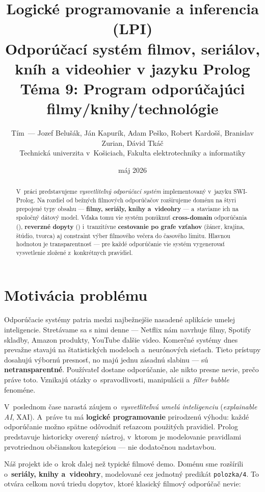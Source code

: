 \documentclass[11pt,a4paper]{article}
\title{
  \large Logické programovanie a inferencia (LPI) \\[0.4em]
  \LARGE Odporúčací systém filmov, seriálov, kníh a videohier v jazyku Prolog \\[0.4em]
  \large Téma 9: Program odporúčajúci filmy/knihy/technológie
}
\author{
  Tím~--- Jozef Belušák, Ján Kapurík, Adam Peško, Robert Kardošš, Branislav Zurian, Dávid Tkáč \\
  Technická univerzita v~Košiciach, Fakulta elektrotechniky a informatiky
}
\date{máj 2026}
\begin{document}
\maketitle

\begin{abstract}
\noindent
V~práci predstavujeme \emph{vysvetliteľný odporúčací systém}
implementovaný v~jazyku SWI-Prolog. Na rozdiel od bežných
filmových odporúčačov rozširujeme doménu na štyri prepojené
typy obsahu --- \textbf{filmy, seriály, knihy a~videohry} --- a~staviame
ich na spoločný dátový model. Vďaka tomu vie systém ponúknuť
\textbf{cross-domain} odporúčania (), \textbf{reverzné
dopyty} () i~tranzitívne
  \textbf{cestovanie po grafe vzťahov} (žáner, krajina, štúdio,
  tvorca) aj constraint výber filmového večera do časového limitu.
  Hlavnou hodnotou je transparentnosť --- pre každé
odporúčanie vie systém vygenerovať vysvetlenie zložené
z~konkrétnych pravidiel.
\end{abstract}

\section{Motivácia problému}

Odporúčacie systémy patria medzi najbežnejšie nasadené aplikácie
umelej inteligencie. Stretávame sa s nimi denne --- Netflix nám
navrhuje filmy, Spotify skladby, Amazon produkty, YouTube ďalšie
video. Komerčné systémy dnes prevažne stavajú na štatistických
modeloch a~neurónových sieťach. Tieto prístupy dosahujú výbornú
presnosť, no majú jednu zásadnú slabinu --- sú
\textbf{netransparentné}. Používateľ dostane odporúčanie, ale
nikto presne nevie, prečo práve toto. Vznikajú otázky o~spravodlivosti,
manipulácii a~\emph{filter bubble} fenoméne.

V~poslednom čase narastá záujem o~\emph{vysvetliteľnú umelú
inteligenciu} (\emph{explainable AI}, XAI). A~práve tu má
\textbf{logické programovanie} prirodzenú výhodu: každé
odporúčanie možno spätne odôvodniť reťazcom použitých pravidiel.
Prolog predstavuje historicky overený nástroj, v~ktorom je
modelovanie pravidlami prvotriednou občianskou kategóriou ---
nie dodatočnou nadstavbou.

Náš projekt ide o~krok ďalej než typické filmové demo. Doménu
sme rozšírili o~\textbf{seriály, knihy a~videohry}, modelované cez jednotný
predikát \texttt{polozka/4}. To otvára celkom novú triedu
dopytov, ktoré klasický filmový odporúčač nevie:
\end{document}
